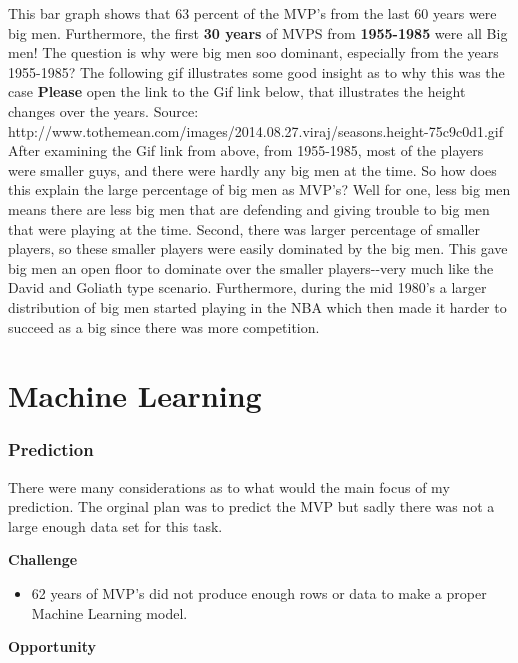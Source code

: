 \documentclass[11pt]{article}
\providecommand{\tightlist}{%
      \setlength{\itemsep}{0pt}\setlength{\parskip}{0pt}}
\begin{document}
This bar graph shows that 63 percent of the MVP's from the last 60 years
were big men. Furthermore, the first \textbf{30 years} of MVPS from
\textbf{1955-1985} were all Big men! The question is why were big men
soo dominant, especially from the years 1955-1985? The following gif
illustrates some good insight as to why this was the case
\textbf{Please} open the link to the Gif link below, that illustrates
the height changes over the years. \newline
Source:
http://www.tothemean.com/images/2014.08.27.viraj/seasons.height-75c9c0d1.gif
\newline
After examining the Gif link from above, from 1955-1985, most of the
players were smaller guys, and there were hardly any big men at the
time. So how does this explain the large percentage of big men as MVP's?
Well for one, less big men means there are less big men that are
defending and giving trouble to big men that were playing at the time.
Second, there was larger percentage of smaller players, so these smaller
players were easily dominated by the big men. This gave big men an open
floor to dominate over the smaller players-\/-very much like the David
and Goliath type scenario. Furthermore, during the mid 1980's a larger
distribution of big men started playing in the NBA which then made it
harder to succeed as a big since there was more competition. 

    \section{Machine Learning}\label{machine-learning}

    \subsubsection{Prediction}\label{prediction}

There were many considerations as to what would the main focus of my
prediction. The orginal plan was to predict the MVP but sadly there was
not a large enough data set for this task.

    \textbf{Challenge}

\begin{itemize}
\tightlist
\item
  62 years of MVP's did not produce enough rows or data to make a proper
  Machine Learning model. \newline
\end{itemize}

\textbf{Opportunity}
\end{document}

